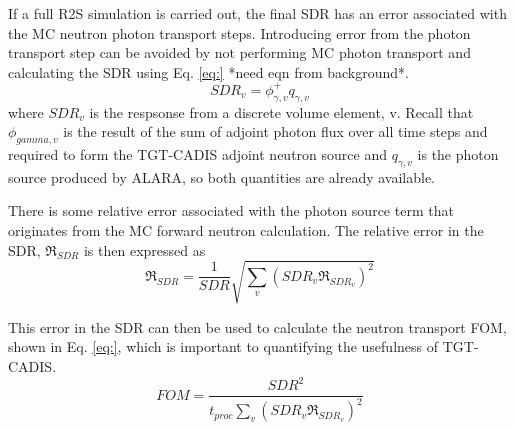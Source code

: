 If a full R2S simulation is carried out, the final SDR has an error associated
with the MC neutron photon transport steps.  Introducing error from the photon transport
step can be avoided by not performing MC photon transport and calculating the
SDR using Eq. \ref{eq:} *need eqn from background*.
\begin{equation}\label{eq:resp_v}
	SDR_v = \phi_{\gamma, v}^{+} q_{\gamma, v}
\end{equation}
where $SDR_v$ is the respsonse from a discrete volume element, v.
Recall that $\phi_{gamma, v}$ is the result of the sum of adjoint photon flux 
over all time steps and required to form the TGT-CADIS adjoint neutron source
and $q_{\gamma, v}$ is the photon source produced by ALARA, so both quantities
are already available.

There is some relative error associated with the photon source term that
originates from the MC forward neutron calculation.  
The relative error in the
SDR, $\Re_{SDR}$ is then expressed as 
\begin{equation}\label{eq:err}
	\Re_{SDR} = \frac{1}{SDR} \sqrt{\sum_v{(SDR_v \Re_{SDR_v})^2}}
\end{equation}

This error in the SDR can then be used to calculate the neutron transport
FOM, shown in Eq. \ref{eq:}, which is important to quantifying the usefulness of TGT-CADIS.
\begin{equation}\label{eq:fom}
	FOM = \frac{SDR^2}{t_{proc}\sum_v{(SDR_v \Re_{SDR_v})^2}}
\end{equation}







